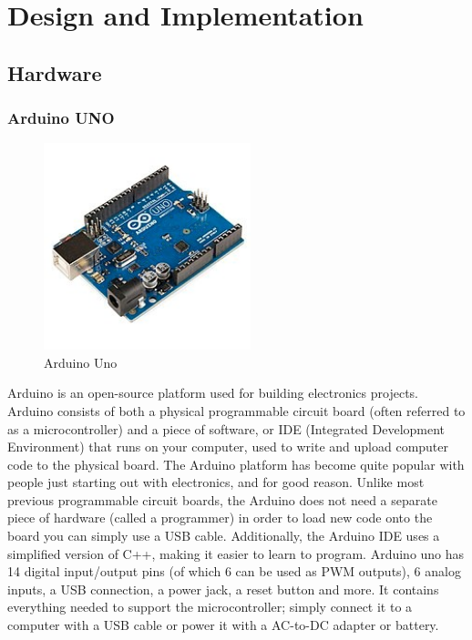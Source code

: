 


\chapter{Design and Implementation}

\section{Hardware}
\subsection{Arduino UNO}
 
	\begin{figure}[h]
		\centering
	\includegraphics[width=60mm,scale=1]{41}
	\caption{Arduino Uno}
	\label{Arduino}
	
\end{figure}
 
 Arduino is an open-source platform used for building electronics projects. Arduino consists of both a physical programmable circuit board (often referred to as a microcontroller) and a piece of software, or IDE (Integrated Development Environment) that runs on your computer, used to write and upload computer code to the physical board. The Arduino platform has become quite popular with people just starting out with electronics, and for good reason. Unlike most previous programmable circuit boards, the Arduino does not need a separate piece of hardware (called a programmer) in order to load new code onto the board you can simply use a USB cable. Additionally, the Arduino IDE uses a simplified version of C++, making it easier to learn to program. Arduino uno has 14 digital input/output pins (of which 6 can be used as PWM outputs), 6 analog inputs, a USB connection, a power jack, a reset button and more. It contains everything needed to support the microcontroller; simply connect it to a computer with a USB cable or power it with a AC-to-DC adapter or battery.
 
